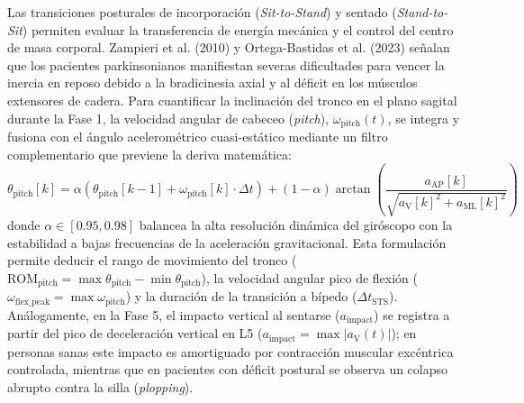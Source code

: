 \documentclass[12pt,a4paper]{article}
\begin{document}
Las transiciones posturales de incorporación (\emph{Sit-to-Stand}) y sentado (\emph{Stand-to-Sit}) permiten evaluar la transferencia de energía mecánica y el control del centro de masa corporal. Zampieri et al. (2010) y Ortega-Bastidas et al. (2023) señalan que los pacientes parkinsonianos manifiestan severas dificultades para vencer la inercia en reposo debido a la bradicinesia axial y al déficit en los músculos extensores de cadera. Para cuantificar la inclinación del tronco en el plano sagital durante la Fase 1, la velocidad angular de cabeceo (\emph{pitch}), $\omega_{\text{pitch}}(t)$, se integra y fusiona con el ángulo acelerométrico cuasi-estático mediante un filtro complementario que previene la deriva matemática:
\[
\theta_{\text{pitch}}[k] = \alpha \left( \theta_{\text{pitch}}[k-1] + \omega_{\text{pitch}}[k] \cdot \Delta t \right) + (1 - \alpha) \arctan \left( \frac{a_{\text{AP}}[k]}{\sqrt{a_{\text{V}}[k]^2 + a_{\text{ML}}[k]^2}} \right)
\]
donde $\alpha \in [0.95, 0.98]$ balancea la alta resolución dinámica del giróscopo con la estabilidad a bajas frecuencias de la aceleración gravitacional. Esta formulación permite deducir el rango de movimiento del tronco ($\text{ROM}_{\text{pitch}} = \max \theta_{\text{pitch}} - \min \theta_{\text{pitch}}$), la velocidad angular pico de flexión ($\omega_{\text{flex\_peak}} = \max \omega_{\text{pitch}}$) y la duración de la transición a bípedo ($\Delta t_{\text{STS}}$). Análogamente, en la Fase 5, el impacto vertical al sentarse ($a_{\text{impact}}$) se registra a partir del pico de deceleración vertical en L5 ($a_{\text{impact}} = \max \lvert a_{\text{V}}(t) \rvert$); en personas sanas este impacto es amortiguado por contracción muscular excéntrica controlada, mientras que en pacientes con déficit postural se observa un colapso abrupto contra la silla (\emph{plopping}).
\end{document}
